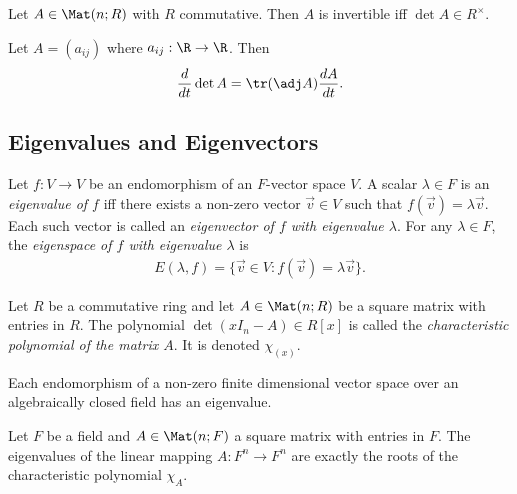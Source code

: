 \documentclass{article}
\begin{document}
\begin{corollary}[Notes 4.4.11]
	Let $A\in\Mat(n;R)$ with $R$ commutative. Then $A$ is invertible iff $\det A\in R^\times$.
\end{corollary}

\begin{theorem}
	Let $A=(a_{ij})$ where $a_{ij}:\R\to\R$. Then
	\begin{align*}
		\frac{d}{dt}\det A = \tr(\adj A)\frac{dA}{dt}.
	\end{align*}
\end{theorem}

\subsection{Eigenvalues and Eigenvectors}

\begin{definition}
	Let $f:V\to V$ be an endomorphism of an $F$-vector space $V$. A scalar $\lambda\in F$ is
	an \emph{eigenvalue of $f$} iff there exists a non-zero vector $\vec v \in V$ such that
	$f(\vec v)=\lambda \vec v$. Each such vector is called an \emph{eigenvector of $f$ with
		eigenvalue $\lambda$}. For any $\lambda\in F$, the \emph{eigenspace of $f$ with eigenvalue $\lambda$}
	is
	\begin{align*}
		E(\lambda,f) = \{\vec v\in V:f(\vec v)=\lambda\vec v\}.
	\end{align*}
\end{definition}

\begin{definition}
	Let $R$ be a commutative ring and let $A\in\Mat(n; R)$ be a square matrix with entries in $R$.
	The polynomial $\det(xI_n-A)\in R[x]$ is called the \emph{characteristic polynomial of the matrix
		$A$}. It is denoted $\chi_(x)$.
\end{definition}

\begin{theorem}[Notes 4.5.4]
	Each endomorphism of a non-zero finite dimensional vector space over an algebraically closed field
	has an eigenvalue.
\end{theorem}

\begin{theorem}[Notes 4.5.8]
	Let $F$ be a field and $A\in\Mat(n;F)$ a square matrix with entries in $F$. The eigenvalues of the
	linear mapping $A:F^n\to F^n$ are exactly the roots of the characteristic polynomial $\chi_A$.
\end{theorem}
\end{document}
